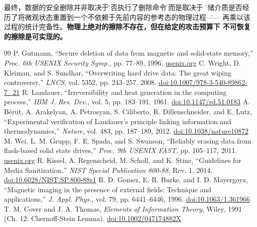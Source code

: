 \documentclass[11pt,a4paper,twoside]{article}
\theoremstyle{definition}\newtheorem{definition}{定义}[section]
\theoremstyle{plain}\newtheorem{theorem}{定理}[section]
\theoremstyle{remark}\newtheorem{remark}{注解}[section]
\begin{document}
最终，数据的安全删除并非取决于\"是否执行了删除命令\"，而是取决于
\"存储介质是否经历了将微观状态重置到一个不依赖于先前内容的参考态的物理过程\"——
再乘以该过程的统计完备性。\textbf{物理上绝对的擦除不存在，但在给定的攻击预算下
不可恢复的擦除是可实现的。}

\begin{thebibliography}{99}
 P. Gutmann, ``Secure deletion of data from magnetic and solid-state memory,'' \textit{Proc. 6th USENIX Security Symp.}, pp. 77--89, 1996. \href{https://www.usenix.org/legacy/publications/library/proceedings/sec96/full_papers/gutmann/}{usenix.org}
 C. Wright, D. Kleiman, and S. Sundhar, ``Overwriting hard drive data: The great wiping controversy,'' \textit{LNCS}, vol. 5352, pp. 243--257, 2008. \href{https://doi.org/10.1007/978-3-540-89862-7_21}{doi:10.1007/978-3-540-89862-7\_21}
 R. Landauer, ``Irreversibility and heat generation in the computing process,'' \textit{IBM J. Res. Dev.}, vol. 5, pp. 183--191, 1961. \href{https://doi.org/10.1147/rd.51.0183}{doi:10.1147/rd.51.0183}
 A. B\'{e}rut, A. Arakelyan, A. Petrosyan, S. Ciliberto, R. Dillenschneider, and E. Lutz, ``Experimental verification of Landauer's principle linking information and thermodynamics,'' \textit{Nature}, vol. 483, pp. 187--189, 2012. \href{https://doi.org/10.1038/nature10872}{doi:10.1038/nature10872}
 M. Wei, L. M. Grupp, F. E. Spada, and S. Swanson, ``Reliably erasing data from flash-based solid state drives,'' \textit{Proc. 9th USENIX FAST}, pp. 105--117, 2011. \href{https://www.usenix.org/conference/fast11/reliably-erasing-data-flash-based-solid-state-drives}{usenix.org}
 R. Kissel, A. Regenscheid, M. Scholl, and K. Stine, ``Guidelines for Media Sanitization,'' \textit{NIST Special Publication 800-88}, Rev. 1, 2014. \href{https://doi.org/10.6028/NIST.SP.800-88r1}{doi:10.6028/NIST.SP.800-88r1}
 R. D. Gomez, E. R. Burke, and I. D. Mayergoyz, ``Magnetic imaging in the presence of external fields: Technique and applications,'' \textit{J. Appl. Phys.}, vol. 79, pp. 6441--6446, 1996. \href{https://doi.org/10.1063/1.361966}{doi:10.1063/1.361966}
 T. M. Cover and J. A. Thomas, \textit{Elements of Information Theory}, Wiley, 1991 (Ch. 12: Chernoff-Stein Lemma). \href{https://doi.org/10.1002/047174882X}{doi:10.1002/047174882X}
\end{thebibliography}
\end{document}
